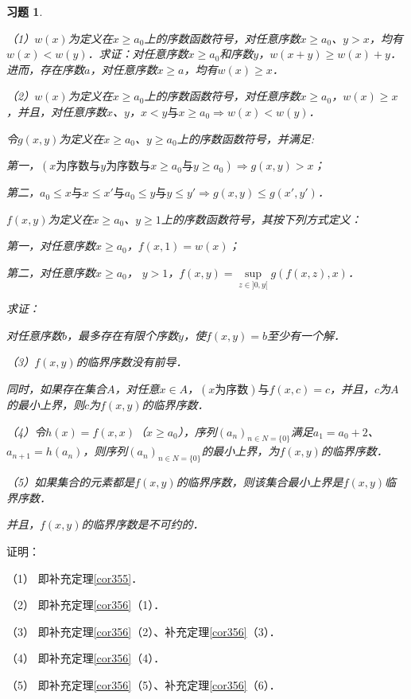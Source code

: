 \documentclass[12pt, a4paper, oneside]{book}
\newtheorem{exer}{习题}
\begin{document}
			\begin{exer}\label{exer168}
				\hfill\par
				（1）$w(x)$为定义在$x\geq a_0$上的序数函数符号，对任意序数$x\geq a_0$、$y>x$，均有$w(x)<w(y)$．求证：对任意序数$x\geq a_0$和序数$y$，$w(x+y)\geq w(x)+y$．进而，存在序数$a$，对任意序数$x\geq a$，均有$w(x)\geq x$．
				\par
				（2）$w(x)$为定义在$x\geq a_0$上的序数函数符号，对任意序数$x\geq a_0$，$w(x)\geq x$，并且，对任意序数$x$、$y$，$x<y\text{与}x\geq a_0\Rightarrow w(x)<w(y)$．
				\par
				令$g(x, y)$为定义在$x\geq a_0$、$y\geq a_0$上的序数函数符号，并满足:
				\par
				第一，$(x\text{为序数}\text{与}y\text{为序数}\text{与}x\geq a_0\text{与}y\geq a_0)\Rightarrow g(x, y)>x$；
				\par
				第二，$a_0\leq x\text{与}x\leq x'\text{与}a_0\leq y\text{与}y\leq y'\Rightarrow g(x, y)\leq g(x', y')$．
				\par
				$f(x, y)$为定义在$x\geq a_0$、$y\geq 1$上的序数函数符号，其按下列方式定义：
				\par
				第一，对任意序数$x\geq a_0$，$f(x, 1)=w(x)$；
				\par
				第二，对任意序数$x\geq a_0$， $y>1$，$f(x, y)=\mathop{sup}\limits_{z\in ]0, y[}g(f(x, z), x)$．
				\par
				求证：
				\par
				对任意序数$b$，最多存在有限个序数$y$，使$f(x, y)=b$至少有一个解．
				\par
				（3）$f(x, y)$的临界序数没有前导．
				\par
				同时，如果存在集合$A$，对任意$x\in A$，$(x\text{为序数})\text{与}f(x, c)=c$，并且，$c$为$A$的最小上界，则$c$为$f(x, y)$的临界序数．
				\par
				（4）令$h(x)=f(x, x)$（$x\geq a_0$），序列$(a_n)_{n\in N=\{0\}}$满足$a_1=a_0+2$、$a_{n+1}=h(a_n)$，则序列$(a_n)_{n\in N=\{0\}}$的最小上界，为$f(x, y)$的临界序数．
				\par
				（5）如果集合的元素都是$f(x, y)$的临界序数，则该集合最小上界是$f(x, y)$临界序数．
				\par
				并且，$f(x, y)$的临界序数是不可约的．
			\end{exer}
			证明：
			\par
			（1）	即补充定理\ref{cor355}．
			\par
			（2）	即补充定理\ref{cor356}（1）．
			\par
			（3）	即补充定理\ref{cor356}（2）、补充定理\ref{cor356}（3）．
			\par
			（4）	即补充定理\ref{cor356}（4）．
			\par
			（5）	即补充定理\ref{cor356}（5）、补充定理\ref{cor356}（6）．
			
\end{document}

